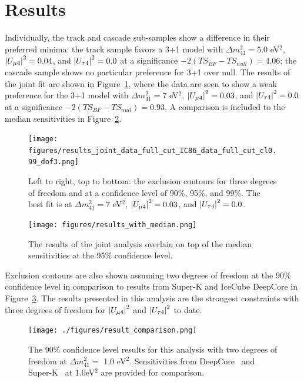 \documentclass[main.tex]{subfiles}
\begin{document}
\section{Results}

Individually, the track and cascade sub-samples show a difference in their preferred minima: the track sample favors a 3+1 model with $\Delta m_{41}^{2}=5.0$ eV$^{2}$, $\left| U_{\mu 4} \right|^{2}=0.04$, and $\left| U_{\tau 4} \right|^{2}=0.0$ at a significance $-2\left(TS_{BF} - TS_{null}\right)=4.06$; the cascade sample shows no particular preference for 3+1 over null.
The results of the joint fit are shown in Figure~\ref{fig:final_results}, where the data are seen to show a weak preference for the 3+1 model with $\Delta m_{41}^{2}=7$ eV$^{2}$, $\left| U_{\mu 4} \right|^{2}=0.03$, and $\left| U_{\tau 4} \right|^{2}=0.0$ at a significance $-2\left(TS_{BF} - TS_{null}\right)=0.93$. 
A comparison is included to the median sensitivities in Figure~\ref{fig:final_results_median}.

\begin{figure}
    \centering
    \texttt{[image: figures/results\_joint\_data\_full\_cut\_IC86\_data\_full\_cut\_cl0.99\_dof3.png]}
    \caption{Left to right, top to bottom: the exclusion contours for three degrees of freedom and at a confidence level of 90\%, 95\%, and 99\%. The best fit is at $\Delta m_{41}^{2}=7$ eV$^{2}$, $\left| U_{\mu 4} \right|^{2}=0.03$, and $\left| U_{\tau 4} \right|^{2}=0.0$.}\label{fig:final_results}
\end{figure}

\begin{figure}
    \centering
    \texttt{[image: figures/results\_with\_median.png]}
    \caption{The results of the joint analysis overlain on top of the median sensitivities at the 95\% confidence level.}\label{fig:final_results_median}
\end{figure}

Exclusion contours are also shown assuming two degrees of freedom at the 90\% confidence level in comparison to results from Super-K and IceCube DeepCore in Figure~\ref{fig:comparison}. 
The results presented in this analysis are the strongest constraints with three degrees of freedom for $\left| U_{\mu 4} \right|^{2}$ and $\left| U_{\tau 4} \right|^{2}$ to date. 


\begin{figure}
    \centering
    \texttt{[image: ./figures/result\_comparison.png]}
    \caption{The 90\% confidence level results for this analysis with two degrees of freedom at $\Delta m_{41}^{2}=$ 1.0 eV$^{2}$. Sensitivities from DeepCore~\cite{Aartsen_2017_dc} and Super-K~\cite{PhysRevD.91.052019} at 1.0eV$^{2}$ are provided for comparison.}\label{fig:comparison}
\end{figure}    
\end{document}
